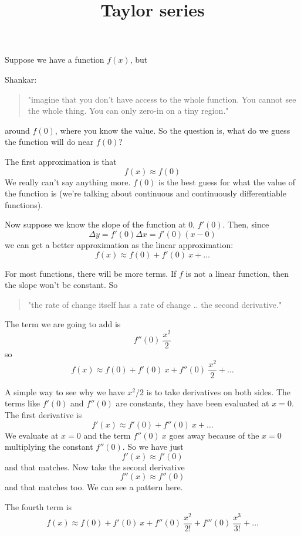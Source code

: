 \documentclass[11pt, oneside]{article}
\title{Taylor series}
\date{}
\begin{document}
\maketitle
\Large

Suppose we have a function $f(x)$, but 

Shankar:

\begin{quote}"imagine that you don't have access to the whole function.  You cannot see the whole thing.  You can only zero-in on a tiny region."\end{quote}

around $f(0)$, where you know the value.  So the question is, what do we guess the function will do near $f(0)$?  
 
The first approximation is that
\[ f(x) \approx f(0) \]
We really can't say anything more.  $f(0)$ is the best guess for what the value of the function is (we're talking about continuous and continuously differentiable functions).

Now suppose we know the slope of the function at $0$, $f'(0)$.  Then, since 
\[ \Delta y = f'(0) \Delta x = f'(0) (x - 0) \]
we can get a better approximation as the linear approximation:
\[ f(x) \approx f(0) + f'(0)\ x + \dots \]

For most functions, there will be more terms.  If $f$ is not a linear function, then the slope won't be constant.  So 

\begin{quote}"the rate of change itself has a rate of change .. the second derivative."\end{quote}  

The term we are going to add is
\[ f''(0)\ \frac{x^2}{2} \]
so
\[ f(x) \approx f(0) + f'(0)\ x + f''(0)\ \frac{x^2}{2}  + \dots \]

A simple way to see why we have $x^2/2$ is to take derivatives on both sides.  The terms like $f'(0)$ and $f''(0)$ are constants, they have been evaluated at $x=0$. The first derivative is
\[ f'(x) \approx  f'(0) + f''(0)\ x  + \dots \]
We evaluate at $x=0$ and the term $f''(0)\ x$ goes away because of the $x=0$ multiplying the constant $f''(0)$.  So we have just
\[ f'(x) \approx  f'(0)  \]
and that matches. Now take the second derivative
\[ f''(x) \approx  f''(0) \]
and that matches too.  We can see a pattern here.  

The fourth term is
\[ f(x) \approx f(0) + f'(0)\ x + f''(0)\ \frac{x^2}{2!}  + f'''(0)\ \frac{x^3}{3!} + \dots \]
\end{document}
